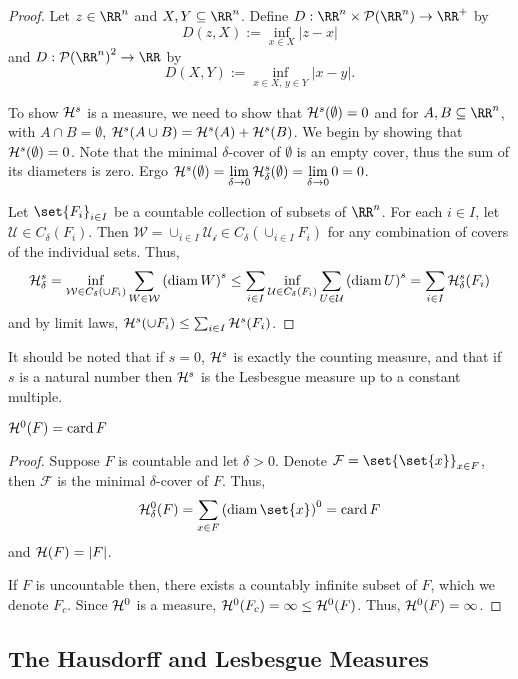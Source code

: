 \begin{proof}
	Let $z\in\RR^n$ and $X, Y\subseteq\RR^n$.
	Define $D:\RR^n\times\mathcal{P}(\RR^n)\rightarrow\RR^+$ by
	\[
		D(z,X) := \inf_{x\in X} |z-x|
	\]
	and $D:{\mathcal{P}(\RR^n)}^2\rightarrow\RR$ by
	\[
		D(X,Y) := \inf_{x\in X,\, y\in Y} |x-y|.
	\]

	To show $\mathcal{H}^s$ is a measure, we need to show that $\mathcal{H}^s(\emptyset)=0$ and for $A,B\subseteq\RR^n$, with $A\cap B=\emptyset$, $\mathcal{H}^s(A\cup B)=\mathcal{H}^s(A)+\mathcal{H}^s(B)$.
	We begin by showing that $\mathcal{H}^s(\emptyset)=0$.
	Note that the minimal $\delta$-cover of $\emptyset$ is an empty cover, thus the sum of its diameters is zero.
	Ergo $\mathcal{H}^s(\emptyset)=\lim\limits_{\delta\rightarrow 0} \mathcal{H}^s_\delta(\emptyset)=\lim\limits_{\delta\rightarrow 0} 0 =0$.

	Let $\set{F_i}_{i\in I}$ be a countable collection of subsets of $\RR^n$.
	For each $i\in I$, let $\mathcal{U}\in C_\delta(F_i)$.
	Then $\mathcal{W}=\cup_{i\in I} \mathcal{U_i}\in C_\delta(\cup_{i\in I} F_i)$ for any combination of covers of the individual sets.
	Thus,
	\[
		\mathcal{H}^s_\delta
		= \inf_{\mathcal{W}\in C_\delta(\cup F_i)} \sum_{W\in\mathcal{W}}{(\operatorname{diam} W)}^s
		\leq \sum_{i\in I} \inf_{\mathcal{U}\in C_\delta(F_i)}\sum_{U\in\mathcal{U}} {(\operatorname{diam} U)}^s
		=\sum_{i\in I} \mathcal{H}^s_\delta(F_i)
	\]
	and by limit laws, $\mathcal{H}^s(\cup F_i)\leq \sum_{i\in I} \mathcal{H}^s(F_i)$.
\end{proof}

It should be noted that if $s=0$, $\mathcal{H}^s$ is exactly the counting measure, and that if $s$ is a natural number then $\mathcal{H}^s$ is the Lesbesgue measure up to a constant multiple.

\begin{thm}
	$\mathcal{H}^0(F)=\operatorname{card} F$
\end{thm}
\begin{proof}
	Suppose $F$ is countable and let $\delta>0$.
	Denote $\mathcal{F}=\set{\set{x}}_{x\in F}$, then $\mathcal{F}$ is the minimal $\delta$-cover of $F$.
	Thus,
	\[
		\hm^0_\delta(F)=\sum_{x\in F} {(\diam\set{x})}^0=\card F
	\]
	and $\mathcal{H}(F)=|F|$.

	If $F$ is uncountable then, there exists a countably infinite subset of $F$, which we denote $F_c$.
	Since $\mathcal{H}^0$ is a measure, $\mathcal{H}^0(F_c)=\infty\leq\mathcal{H}^0(F)$.
	Thus, $\mathcal{H}^0(F)=\infty$.
\end{proof}

\subsection{The Hausdorff and Lesbesgue Measures}

